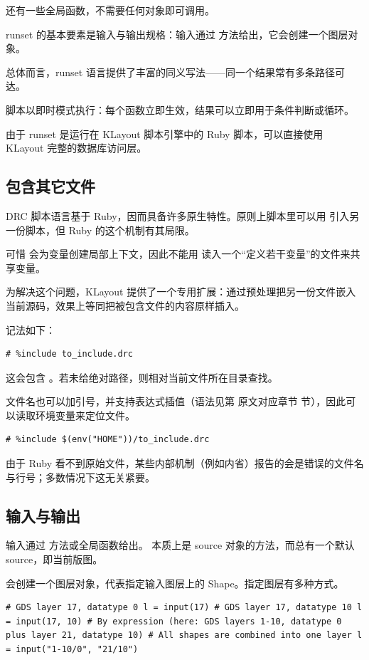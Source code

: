 还有一些全局函数，不需要任何对象即可调用。

runset 的基本要素是输入与输出规格：输入通过  方法给出，它会创建一个图层对象。

总体而言，runset 语言提供了丰富的同义写法——同一个结果常有多条路径可达。

脚本以即时模式执行：每个函数立即生效，结果可以立即用于条件判断或循环。

由于 runset 是运行在 KLayout 脚本引擎中的 Ruby 脚本，可以直接使用 KLayout 完整的数据库访问层。

\subsection{包含其它文件}

DRC 脚本语言基于 Ruby，因而具备许多原生特性。原则上脚本里可以用  引入另一份脚本，但 Ruby 的这个机制有其局限。

可惜  会为变量创建局部上下文，因此不能用  读入一个“定义若干变量”的文件来共享变量。

为解决这个问题，KLayout 提供了一个专用扩展：通过预处理把另一份文件嵌入当前源码，效果上等同把被包含文件的内容原样插入。

记法如下：

\begin{lstlisting}
# %include to_include.drc
\end{lstlisting}

这会包含 。若未给绝对路径，则相对当前文件所在目录查找。

文件名也可以加引号，并支持表达式插值（语法见第 原文对应章节 节），因此可以读取环境变量来定位文件。

\begin{lstlisting}
# %include $(env("HOME"))/to_include.drc
\end{lstlisting}

由于 Ruby 看不到原始文件，某些内部机制（例如内省）报告的会是错误的文件名与行号；多数情况下这无关紧要。

\subsection{输入与输出}

输入通过  方法或全局函数给出。 本质上是 source 对象的方法，而总有一个默认 source，即当前版图。

 会创建一个图层对象，代表指定输入图层上的 Shape。指定图层有多种方式。

\begin{lstlisting}
# GDS layer 17, datatype 0 l = input(17) # GDS layer 17, datatype 10 l = input(17, 10) # By expression (here: GDS layers 1-10, datatype 0 plus layer 21, datatype 10) # All shapes are combined into one layer l = input("1-10/0", "21/10")
\end{lstlisting}

